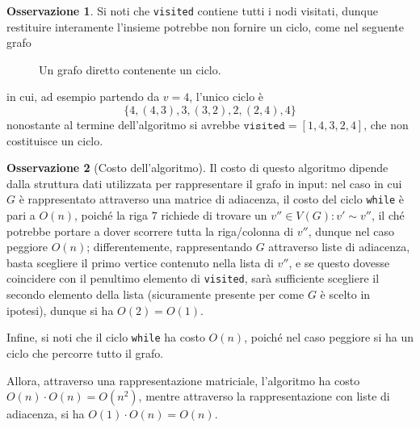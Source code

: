 \documentclass[14pt]{extreport}
\theoremstyle{definition}
\theoremstyle{definition}
\newtheorem{remark}{Osservazione}[subsection]
\begin{document}
\begin{remark}
    Si noti che \texttt{visited} contiene tutti i nodi visitati, dunque restituire interamente l'insieme potrebbe non fornire un ciclo, come nel seguente grafo
    \begin{figure}[H]
        \centering
        \caption{Un grafo diretto contenente un ciclo.}
    \end{figure}

    in cui, ad esempio partendo da $v= 4$, l'unico ciclo è $$\{4, (4, 3), 3, (3, 2), 2, (2, 4), 4\}$$ nonostante al termine dell'algoritmo si avrebbe $\texttt{visited}=[1, 4, 3, 2, 4]$, che non costituisce un ciclo.

\end{remark}

\begin{remark}[Costo dell'algoritmo]
    Il costo di questo algoritmo dipende dalla struttura dati utilizzata per rappresentare il grafo in input: nel caso in cui $G$ è rappresentato attraverso una matrice di adiacenza, il costo del ciclo \texttt{while} è pari a $O(n)$, poiché la riga $7$ richiede di trovare un $v'' \in V(G) : v' \sim v''$, il ché potrebbe portare a dover scorrere tutta la riga/colonna di $v''$, dunque nel caso peggiore $O(n)$; differentemente, rappresentando $G$ attraverso liste di adiacenza, basta scegliere il primo vertice contenuto nella lista di $v''$, e se questo dovesse coincidere con il penultimo elemento di \texttt{visited}, sarà sufficiente scegliere il secondo elemento della lista (sicuramente presente per come $G$ è scelto in ipotesi), dunque si ha $O(2) = O(1)$.

    Infine, si noti che il ciclo \texttt{while} ha costo $O(n)$, poiché nel caso peggiore si ha un ciclo che percorre tutto il grafo.

    Allora, attraverso una rappresentazione matriciale, l'algoritmo ha costo $O(n) \cdot O(n) = O(n^2)$, mentre attraverso la rappresentazione con liste di adiacenza, si ha $O(1) \cdot O(n) = O(n)$.
\end{remark}
\end{document}
